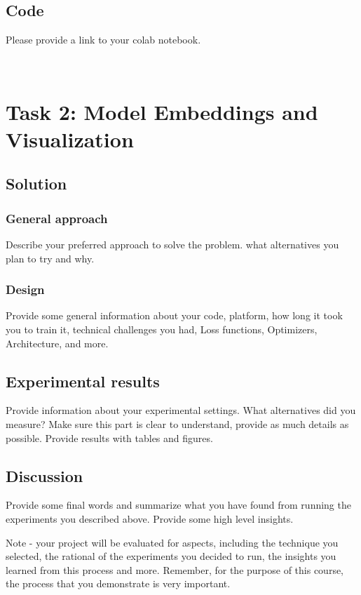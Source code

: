 \documentclass{article}
\begin{document}
\subsection{Code}

Please provide a link to your colab notebook.


\
\section{Task 2: Model Embeddings and Visualization}

\subsection{Solution}
\subsubsection{General approach}
Describe your preferred approach to solve the problem. what alternatives you plan to try and why. 

\subsubsection{Design}
Provide some general information about your code, platform, how long it took you to train it, technical challenges you had, Loss functions, Optimizers, Architecture, and more.

\subsection{Experimental results}
Provide information about your experimental settings. What alternatives did you measure? Make sure this part is clear to understand, provide as much details as possible. Provide results with tables and figures.

\subsection{Discussion}
Provide some final words and summarize what you have found from running the experiments you described above. Provide some high level insights.

Note - your project will be evaluated for aspects, including the technique you selected, the rational of the experiments you decided to run, the insights you learned from this process and more. Remember, for the purpose of this course, the process that you demonstrate is very  important.
\end{document}

